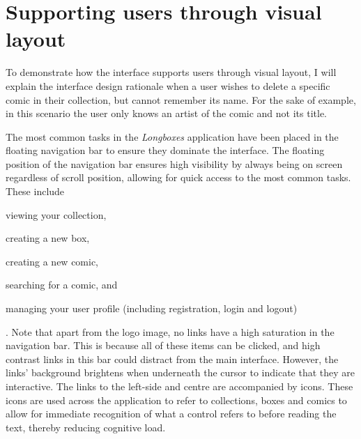 \documentclass[fontsize=12pt,a4paper]{scrreprt}
\begin{document}
\section{Supporting users through visual layout}


To demonstrate how the interface supports users through visual layout, I will explain the interface design rationale when a user wishes to delete a specific comic in their collection, but cannot remember its name. For the sake of example, in this scenario the user only knows an artist of the comic and not its title.


The most common tasks in the \emph{Longboxes} application have been placed in the floating navigation bar to ensure they dominate the interface. The floating position of the navigation bar ensures high visibility by always being on screen regardless of scroll position, allowing for quick access to the most common tasks. These include
\begin{inparaenum}
  \item viewing your collection,
  \item creating a new box,
  \item creating a new comic,
  \item searching for a comic, and
  \item managing your user profile (including registration, login and logout)%
\end{inparaenum}. Note that apart from the logo image, no links have a high saturation in the navigation bar. This is because all of these items can be clicked, and high contrast links in this bar could distract from the main interface. However, the links' background brightens when underneath the cursor to indicate that they are interactive. The links to the left-side and centre are accompanied by icons. These icons are used across the application to refer to collections, boxes and comics to allow for immediate recognition of what a control refers to before reading the text, thereby reducing cognitive load.
\end{document}
